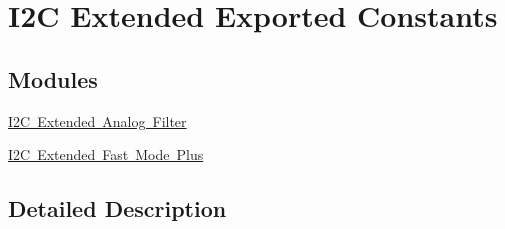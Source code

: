 \hypertarget{group___i2_c_ex___exported___constants}{}\section{I2C Extended Exported Constants}
\label{group___i2_c_ex___exported___constants}
\subsection*{Modules}
\begin{DoxyCompactItemize}
\item 
\mbox{\hyperlink{group___i2_c_ex___analog___filter}{I2\+C Extended Analog Filter}}
\item 
\mbox{\hyperlink{group___i2_c_ex___fast_mode_plus}{I2\+C Extended Fast Mode Plus}}
\end{DoxyCompactItemize}


\subsection{Detailed Description}
